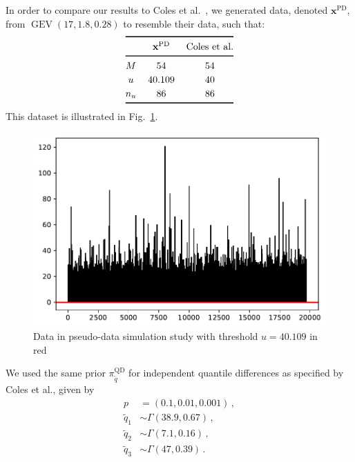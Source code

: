 \documentclass{article}
\begin{document}
%
In order to compare our results to Coles et al.~\cite{coles1996},
we generated data, denoted $\mathbf{x}^{\text{PD}}$,
from $\operatorname{GEV}(17, 1.8, 0.28)$ to resemble their data, such that:
%
\begin{align*}
	\centering
	\renewcommand{\arraystretch}{1.2}
	\begin{tabular}{@{}ccc@{}}
		\toprule[0.1em]
		&$\mathbf{x}^{\text{PD}}$ &Coles et al.\\
		\midrule[0.1em]
		$M$ &$54$ &$54$ \\
		$u$ &$40.109$ &$40$ \\
		$n_u$ &$86$ &$86$ \\
		\bottomrule[0.1em]
	\end{tabular}
\end{align*}
%
This dataset is illustrated in Fig.~\ref{fig:pd-data}.
%
\begin{figure}
	\centering
	\includegraphics[width=0.7\linewidth]{../plots/pd-data.pdf}
	\caption{Data in pseudo-data simulation study with
		threshold $u = 40.109$ in red}
	\label{fig:pd-data}
\end{figure}
%

%
We used the same prior $\pi^{\text{QD}}_{\tilde{q}}$
for independent quantile differences as specified by Coles et al., given by
%
\begin{align*}
	p &= (0.1, 0.01, 0.001) \,,\\
	\tilde{q}_1 &\sim \Gamma(38.9, 0.67) \,,\\
	\tilde{q}_2 &\sim \Gamma(7.1, 0.16) \,,\\
	\tilde{q}_3 &\sim \Gamma(47, 0.39) \,.
\end{align*}
%
\end{document}
